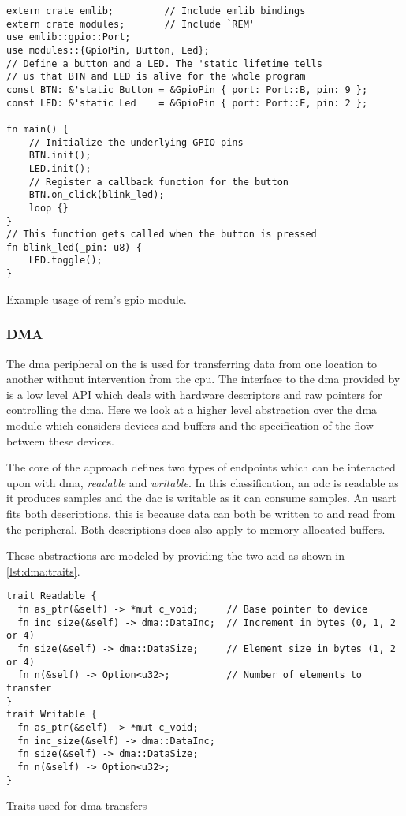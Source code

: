 \begin{listing}[H]
  \begin{verbatim}
extern crate emlib;         // Include emlib bindings
extern crate modules;       // Include `REM'
use emlib::gpio::Port;
use modules::{GpioPin, Button, Led};
// Define a button and a LED. The 'static lifetime tells
// us that BTN and LED is alive for the whole program
const BTN: &'static Button = &GpioPin { port: Port::B, pin: 9 };
const LED: &'static Led    = &GpioPin { port: Port::E, pin: 2 };

fn main() {
    // Initialize the underlying GPIO pins
    BTN.init();
    LED.init();
    // Register a callback function for the button
    BTN.on_click(blink_led);
    loop {}
}
// This function gets called when the button is pressed
fn blink_led(_pin: u8) {
    LED.toggle();
}
  \end{verbatim}
  \caption{Example usage of \gls{rem}'s \gls{gpio} module.}
  \label{lst:gpio_abstraction}
\end{listing}

\subsubsection{DMA}

The \gls{dma} peripheral on the {\gecko} is used for transferring data from one location to another without intervention from the \gls{cpu}.
The interface to the \gls{dma} provided by {\emlib} is a low level API which deals with hardware descriptors and raw pointers for controlling the \gls{dma}.
Here we look at a higher level abstraction over the \gls{dma} module which considers devices and buffers and the specification of the flow between these devices.

The core of the approach defines two types of endpoints which can be interacted upon with \gls{dma}, \emph{readable} and \emph{writable}.
In this classification, an \gls{adc} is readable as it produces samples and the \gls{dac} is writable as it can consume samples.
An \gls{usart} fits both descriptions, this is because data can both be written to and read from the peripheral.
Both descriptions does also apply to memory allocated buffers.

These abstractions are modeled by providing the two   and  as shown in \autoref{lst:dma:traits}.

\begin{listing}[H]
  \begin{verbatim}
trait Readable {
  fn as_ptr(&self) -> *mut c_void;     // Base pointer to device
  fn inc_size(&self) -> dma::DataInc;  // Increment in bytes (0, 1, 2 or 4)
  fn size(&self) -> dma::DataSize;     // Element size in bytes (1, 2 or 4)
  fn n(&self) -> Option<u32>;          // Number of elements to transfer
}
trait Writable {
  fn as_ptr(&self) -> *mut c_void;
  fn inc_size(&self) -> dma::DataInc;
  fn size(&self) -> dma::DataSize;
  fn n(&self) -> Option<u32>;
}
  \end{verbatim}
  \caption{Traits used for \gls{dma} transfers}
  \label{lst:dma:traits}
\end{listing}

